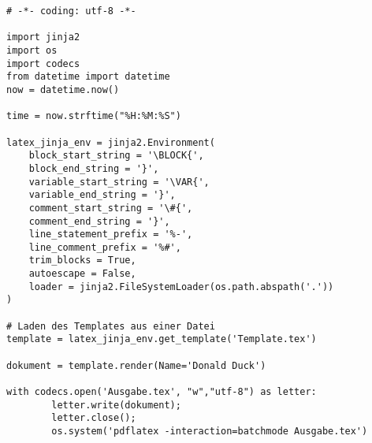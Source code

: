 \documentclass{article}
\begin{document}
\begin{verbatim}
# -*- coding: utf-8 -*-

import jinja2
import os
import codecs
from datetime import datetime
now = datetime.now()

time = now.strftime("%H:%M:%S")

latex_jinja_env = jinja2.Environment(
    block_start_string = '\BLOCK{',
    block_end_string = '}',
    variable_start_string = '\VAR{',
    variable_end_string = '}',
    comment_start_string = '\#{',
    comment_end_string = '}',
    line_statement_prefix = '%-',
    line_comment_prefix = '%#',
    trim_blocks = True,
    autoescape = False,
    loader = jinja2.FileSystemLoader(os.path.abspath('.'))
)

# Laden des Templates aus einer Datei
template = latex_jinja_env.get_template('Template.tex')

dokument = template.render(Name='Donald Duck')

with codecs.open('Ausgabe.tex', "w","utf-8") as letter:
        letter.write(dokument);
        letter.close();
        os.system('pdflatex -interaction=batchmode Ausgabe.tex')

\end{verbatim}
\end{document}
